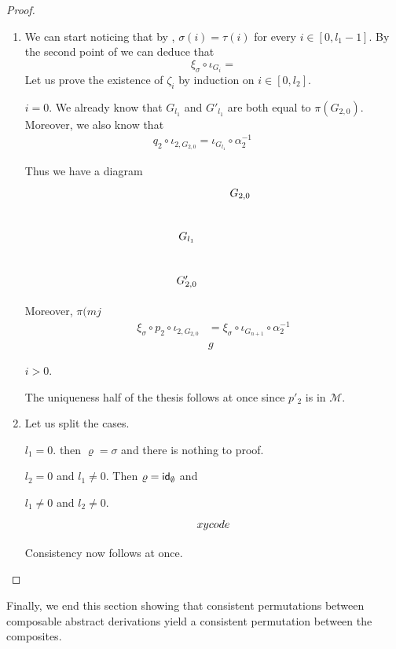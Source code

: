 \begin{proof}\begin{enumerate}
		\item We can start noticing that  by , $\sigma(i)=\tau(i)$ for every $i\in  [0, l_1-1]$. By the second point of  we can deduce that
		\[\xi_\sigma \circ \iota_{G_{i}}=\]Let us prove the existence of $\zeta_i$ by induction on $i\in [0, l_2]$.
		
		\smallskip \noindent $i=0$. We already know that $G_{l_1}$ and $G'_{l_1}$ are both equal to $\pi(G_{2,0})$.  Moreover, we also know that
		\begin{align*}
		q_2\circ \iota_{2, G_{2,0}}=\iota_{G_{l_1}} \circ \alpha^{-1}_2 \qquad
		\end{align*}

		Thus we have a diagram
		\[\xymatrix{&G_{2,0} \\
		G_{l_1} \\
		G'_{2,0}&}\]
		
	Moreover, $\pi(mj$
		\begin{align*}
			\xi_\sigma \circ p_2\circ \iota_{2, G_{2,0}}&=\xi_\sigma \circ \iota_{G_{n+1}}\circ \alpha^{-1}_2\\&g
		\end{align*}

		\smallskip \noindent $i>0$.
		
		
		The uniqueness half of the thesis follows at once since $p'_2$ is in $\mathcal{M}$. 
		
		\item Let us split the cases.
		
		\smallskip \noindent $l_1=0$. then $\varrho=\sigma$ and there is nothing to proof. 
		
		\smallskip \noindent $l_2=0$ and $l_1\neq0$. Then $\varrho=\mathsf{id}_{\emptyset}$ and
		
		\smallskip \noindent $l_1\neq0$ and $l_2\neq 0$. 
		\[\xymatrix{xy code}\]
		
		
		
		Consistency now follows at once. \qedhere 
	\end{enumerate}
\end{proof}


Finally, we  end this section showing that consistent permutations between composable abstract derivations yield a consistent permutation between the composites.


